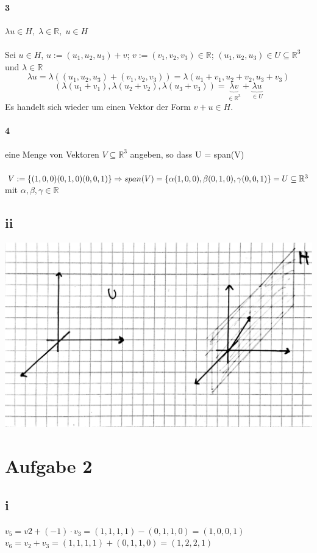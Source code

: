 \documentclass[10pt,a4paper]{article}
\begin{document}
 \paragraph{3} $ \lambda u \in H, \; \lambda \in \mathbb{R}, \; u \in H $\\\\
 Sei $ u \in H $, $u:=(u_1,u_2,u_3)+v$; $v:=(v_1,v_2,v_3) \in\mathbb{R}$; $(u_1,u_2,u_3) \in U\subseteq \mathbb{R}^3$ und $\lambda \in \mathbb{R}$\\
 $$ \lambda u = \lambda ((u_1,u_2,u_3)+(v_1,v_2,v_3))= \lambda (u_1+v_1,u_2+v_2,u_3+v_3)$$
 $$ (\lambda (u_1+v_1),\lambda (u_2+v_2),\lambda (u_3+v_3))= \underbrace{\lambda v}_{\in \mathbb{R}^3} + \underbrace{\lambda u}_{\in U}$$
  Es handelt sich wieder um einen Vektor der Form $v + u \in H$.
  \paragraph{4}eine Menge von Vektoren $V \subseteq \mathbb{R}^3$ angeben, so dass U = span(V)\\\\
  $ V := \{(1,0,0)(0,1,0)(0,0,1)\} \\\Rightarrow span(V)=\{ \alpha(1,0,0),\beta(0,1,0),\gamma(0,0,1) \} = U \subseteq \mathbb{R}^3$ mit $ \alpha, \beta, \gamma \in \mathbb{R}$
 \subsection{ii}
\includegraphics[scale=0.17]{la_1.jpg} 
 \section{Aufgabe 2}
 \subsection{i}
 $v_5 = v2+(-1)\cdot v_3 = (1,1,1,1)-(0,1,1,0)=(1,0,0,1)$ \checkmark \\
 $v_6 = v_2+v_3 = (1,1,1,1) + (0,1,1,0) = (1,2,2,1)$ \checkmark \\
\end{document}
